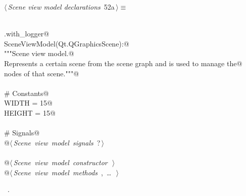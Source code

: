 \documentclass[
    a4paper,      %
    10pt,         %
    openright,    %
    notitlepage,  %
    parskip=half, %
]{scrreprt}       %
\theoremstyle{definition}                    %
\begin{document}
\begin{flushleft} \small
\begin{minipage}{\linewidth}\label{scrap80}\raggedright\small
{} $\langle\,${\itshape Scene view model declarations}\nobreak\ {\footnotesize {52a}}$\,\rangle\equiv$
\vspace{-1exm}
\begin{list}{}{} \item
\mbox{}\lstinline@@\\
\mbox{}\lstinline@common.with_logger@\\
\mbox{}\lstinline@class SceneViewModel(Qt.QGraphicsScene):@\\
\mbox{}\lstinline@    """Scene view model.@\\
\mbox{}\lstinline@    Represents a certain scene from the scene graph and is used to manage the@\\
\mbox{}\lstinline@    nodes of that scene."""@\\
\mbox{}\lstinline@@\\
\mbox{}\lstinline@    # Constants@\\
\mbox{}\lstinline@    WIDTH = 15@\\
\mbox{}\lstinline@    HEIGHT = 15@\\
\mbox{}\lstinline@@\\
\mbox{}\lstinline@    # Signals@\\
\mbox{}\lstinline@    @\hbox{$\langle\,${\itshape Scene view model signals}\nobreak\ {\footnotesize ?}$\,\rangle$}\lstinline@@\\
\mbox{}\lstinline@@\\
\mbox{}\lstinline@    @\hbox{$\langle\,${\itshape Scene view model constructor}\nobreak\ {\footnotesize {}}$\,\rangle$}\lstinline@@\\
\mbox{}\lstinline@    @\hbox{$\langle\,${\itshape Scene view model methods}\nobreak\ {\footnotesize {}, \ldots\ }$\,\rangle$}\lstinline@@\\
\mbox{}\lstinline@@{\NWsep}
\end{list}
\vspace{-1.5ex}
\footnotesize
\begin{list}{}{\setlength{\itemsep}{-\parsep}\setlength{\itemindent}{-\leftmargin}}
\item \NWtxtMacroRefIn\ .

\item{}
\end{list}
\end{minipage}\vspace{4ex}
\end{flushleft}
\end{document}
